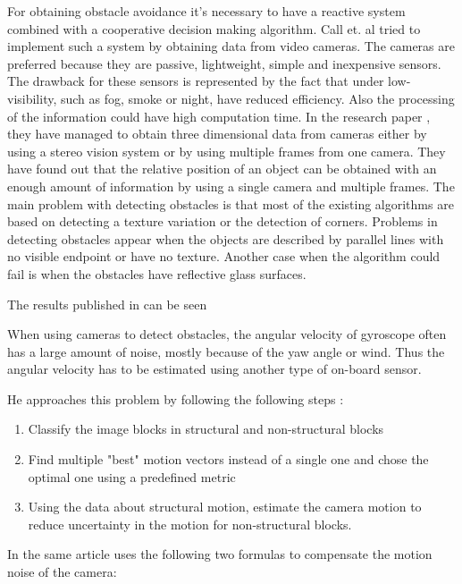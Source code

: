 For obtaining obstacle avoidance it's necessary to have a reactive system combined
with a cooperative decision making algorithm. Call et. al tried to implement
such a system by obtaining data from video cameras. The cameras are preferred
because they are passive, lightweight, simple and inexpensive sensors. The
drawback for these sensors is represented by the fact that under low-visibility, 
such as fog, smoke or night, have reduced efficiency. Also the processing of the
information could have high computation time. In the research paper \cite{tracking}, 
they have managed to obtain three dimensional data from cameras either by using
a stereo vision system or by using multiple frames from one camera. They have
found out that the relative position of an object can be obtained with an
enough amount of information by using a single camera and multiple frames. The 
main problem with detecting obstacles is that most of the existing algorithms 
are based on detecting a texture variation or the detection of corners. Problems
in detecting obstacles appear when the objects are described by parallel lines 
with no visible endpoint or have no texture. Another case when the algorithm could
fail is when the obstacles have reflective glass surfaces.

The results published in \cite{tracking} can be seen 

\newpage

When using cameras to detect obstacles, the angular velocity of gyroscope often
has a large amount of noise, mostly because of the yaw angle or wind. Thus
the angular velocity has to be estimated using another type of on-board sensor. 

He approaches this problem by following the following steps \cite{vision-based}:
\begin{enumerate}
\item Classify the image blocks in structural and non-structural blocks
\item Find multiple "best" motion vectors instead of a single one and chose the
optimal one using a predefined metric
\item Using the data about structural motion, estimate the camera motion to reduce
uncertainty in the motion for non-structural blocks.
\end{enumerate}

In the same article \cite{vision-based} uses the following two formulas to
compensate the motion noise of the camera:


